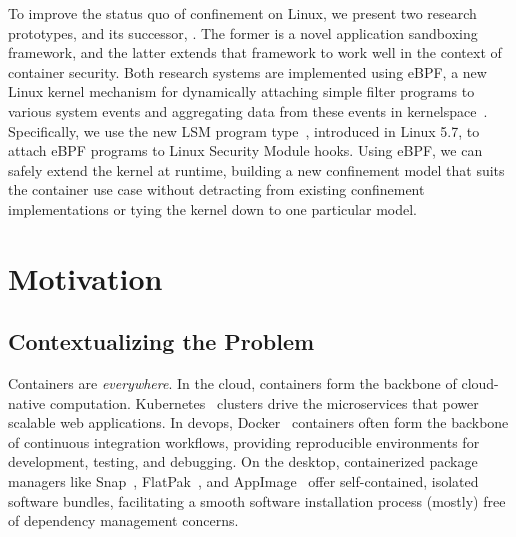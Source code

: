 To improve the status quo of confinement on Linux, we present two research prototypes,
\bpfbox{} and its successor, \bpfcontain{}. The former is a novel application sandboxing
framework, and the latter extends that framework to work well in the context of container
security. Both research systems are implemented using eBPF, a new Linux kernel mechanism
for dynamically attaching simple filter programs to various system events and aggregating
data from these events in kernelspace~\cite{gregg2019_bpf, starovoitov2014_ebpf}.
Specifically, we use the new LSM program type~\cite{singh2019_krsi}, introduced in Linux
5.7, to attach eBPF programs to Linux Security Module hooks. Using eBPF, we can safely
extend the kernel at runtime, building a new confinement model that suits the container
use case without detracting from existing confinement implementations or tying the kernel
down to one particular model.


\section{Motivation}%
\label{s:motivation}

\subsection{Contextualizing the Problem}%
\label{ss:contextualizing-the-problem}

Containers are \textit{everywhere}. In the cloud, containers form the backbone of
cloud-native computation. Kubernetes~ clusters drive the microservices that
power scalable web applications. In devops, Docker~ containers often form the
backbone of continuous integration workflows, providing reproducible environments for
development, testing, and debugging. On the desktop, containerized package managers like
Snap~, FlatPak~, and AppImage~ offer self-contained,
isolated software bundles, facilitating a smooth software installation process (mostly)
free of dependency management concerns.

